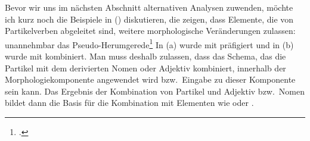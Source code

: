 Bevor wir uns im nächsten Abschnitt alternativen Analysen zuwenden, möchte
ich kurz noch die Beispiele in () diskutieren, die zeigen, dass Elemente, die von Partikelverben
abgeleitet sind, weitere morphologische Veränderungen zulassen:
\eal
\label{pvs-in-morphology}
\ex 
unannehmbar
\ex 
das Pseudo-Herumgerede\footnote{
        .%
    }
\zl
In (a) wurde  mit  präfigiert und in (b) wurde
 mit  kombiniert. Man muss deshalb zulassen,
dass das Schema, das die Partikel mit dem derivierten Nomen oder Adjektiv kombiniert,
innerhalb der Morphologiekomponente angewendet wird bzw.\ Eingabe zu dieser Komponente sein
kann. 
Das Ergebnis der
Kombination von Partikel und Adjektiv bzw.\ Nomen 
bildet dann die Basis für die
Kombination mit Elementen wie  oder .
\begin{comment}
The combination of particle and verbal stem in the morphological component is also needed
for compounds like those in (\mex{1}):\footnote{
        See \citew[\page 55]{Groos89a} for similar Dutch\il{Dutch} examples.
}
\eal
\ex 
\gll Einschreibformular\\
     in.write.form\\
\glt `registration form'
\ex  
\gll Einwickelpapier\\
     in.wrap.paper\\
\glt `wrapping paper'
\zl
\end{comment}
%
%






